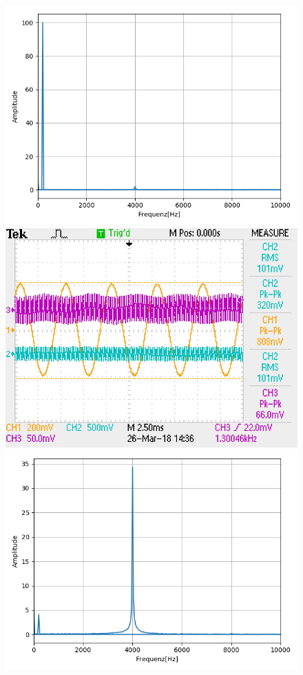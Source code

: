 \documentclass[12pt,a4paper]{article}
\begin{document}
\begin{figure}
\includegraphics[scale=0.5]{Bilder/Vorversuch3/Vor3_1.png}
\includegraphics[scale=0.9]{Bilder/Vorversuch3/F0002TEK.JPG}
\includegraphics[scale=0.5]{Bilder/Vorversuch3/Vor3_2.png}

\end{figure}
\end{document}
